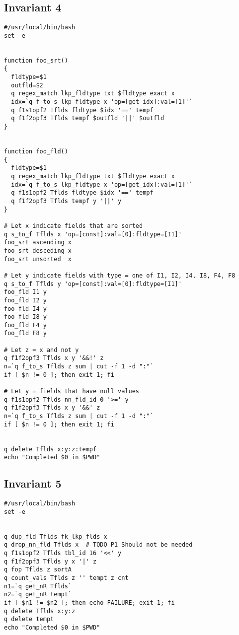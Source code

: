 \documentclass{report}
\begin{document}
\subsection{Invariant 4}
\label{code_4} 
\begin{verbatim}
#/usr/local/bin/bash
set -e 


function foo_srt()
{
  fldtype=$1
  outfld=$2
  q regex_match lkp_fldtype txt $fldtype exact x
  idx=`q f_to_s lkp_fldtype x 'op=[get_idx]:val=[1]'`
  q f1s1opf2 Tflds fldtype $idx '==' tempf
  q f1f2opf3 Tflds tempf $outfld '||' $outfld
}


function foo_fld()
{
  fldtype=$1
  q regex_match lkp_fldtype txt $fldtype exact x
  idx=`q f_to_s lkp_fldtype x 'op=[get_idx]:val=[1]'`
  q f1s1opf2 Tflds fldtype $idx '==' tempf
  q f1f2opf3 Tflds tempf y '||' y
}

# Let x indicate fields that are sorted
q s_to_f Tflds x 'op=[const]:val=[0]:fldtype=[I1]'
foo_srt ascending x
foo_srt desceding x
foo_srt unsorted  x

# Let y indicate fields with type = one of I1, I2, I4, I8, F4, F8
q s_to_f Tflds y 'op=[const]:val=[0]:fldtype=[I1]'
foo_fld I1 y
foo_fld I2 y
foo_fld I4 y
foo_fld I8 y
foo_fld F4 y
foo_fld F8 y

# Let z = x and not y
q f1f2opf3 Tflds x y '&&!' z
n=`q f_to_s Tflds z sum | cut -f 1 -d ":"`
if [ $n != 0 ]; then exit 1; fi 

# Let y = fields that have null values
q f1s1opf2 Tflds nn_fld_id 0 '>=' y
q f1f2opf3 Tflds x y '&&' z
n=`q f_to_s Tflds z sum | cut -f 1 -d ":"`
if [ $n != 0 ]; then exit 1; fi 


q delete Tflds x:y:z:tempf
echo "Completed $0 in $PWD"
\end{verbatim}
\subsection{Invariant 5}
\label{code_5} 
\begin{verbatim}
#/usr/local/bin/bash
set -e 


q dup_fld Tflds fk_lkp_flds x
q drop_nn_fld Tflds x  # TODO P1 Should not be needed
q f1s1opf2 Tflds tbl_id 16 '<<' y
q f1f2opf3 Tflds y x '|' z 
q fop Tflds z sortA
q count_vals Tflds z '' tempt z cnt
n1=`q get_nR Tflds`
n2=`q get_nR tempt`
if [ $n1 != $n2 ]; then echo FAILURE; exit 1; fi 
q delete Tflds x:y:z
q delete tempt
echo "Completed $0 in $PWD"
\end{verbatim}
\end{document}
